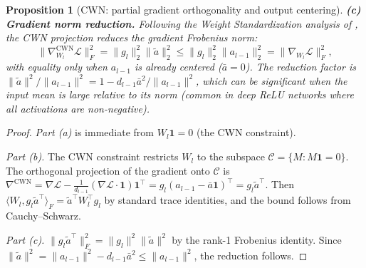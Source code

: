 \documentclass{article}
\providecommand{\norm}[1]{\lVert #1 \rVert}
\theoremstyle{plain}
\newtheorem{proposition}{Proposition}
\theoremstyle{definition}
\theoremstyle{remark}
\begin{document}
\begin{proposition}[CWN: partial gradient orthogonality and output centering]
\textbf{(c) Gradient norm reduction.} Following the Weight Standardization analysis of \citet{qiao2019ws}, the CWN projection reduces the gradient Frobenius norm:
\begin{equation}
\label{eq:cwn_grad_reduction}
    \norm{\nabla_{W_l}^{\mathrm{CWN}}\mathcal{L}}_F^2 = \norm{g_l}_2^2\norm{\tilde{a}}_2^2 \leq \norm{g_l}_2^2\norm{a_{l-1}}_2^2 = \norm{\nabla_{W_l}\mathcal{L}}_F^2,
\end{equation}
with equality only when $a_{l-1}$ is already centered ($\bar{a} = 0$). The reduction factor is $\norm{\tilde{a}}^2/\norm{a_{l-1}}^2 = 1 - d_{l-1}\bar{a}^2/\norm{a_{l-1}}^2$, which can be significant when the input mean is large relative to its norm (common in deep ReLU networks where all activations are non-negative).
\end{proposition}

\begin{proof}
\emph{Part (a)} is immediate from $W_l\mathbf{1} = 0$ (the CWN constraint).

\emph{Part (b).} The CWN constraint restricts $W_l$ to the subspace $\mathcal{C} = \{M : M\mathbf{1} = 0\}$. The orthogonal projection of the gradient onto $\mathcal{C}$ is $\nabla^{\mathrm{CWN}} = \nabla\mathcal{L} - \frac{1}{d_{l-1}}(\nabla\mathcal{L}\cdot\mathbf{1})\mathbf{1}^\top = g_l(a_{l-1} - \bar{a}\mathbf{1})^\top = g_l\tilde{a}^\top$. Then $\langle W_l, g_l\tilde{a}^\top\rangle_F = \tilde{a}^\top W_l^\top g_l$ by standard trace identities, and the bound follows from Cauchy--Schwarz.

\emph{Part (c).} $\norm{g_l\tilde{a}^\top}_F^2 = \norm{g_l}^2\norm{\tilde{a}}^2$ by the rank-1 Frobenius identity. Since $\norm{\tilde{a}}^2 = \norm{a_{l-1}}^2 - d_{l-1}\bar{a}^2 \leq \norm{a_{l-1}}^2$, the reduction follows.
\end{proof}

\end{document}
